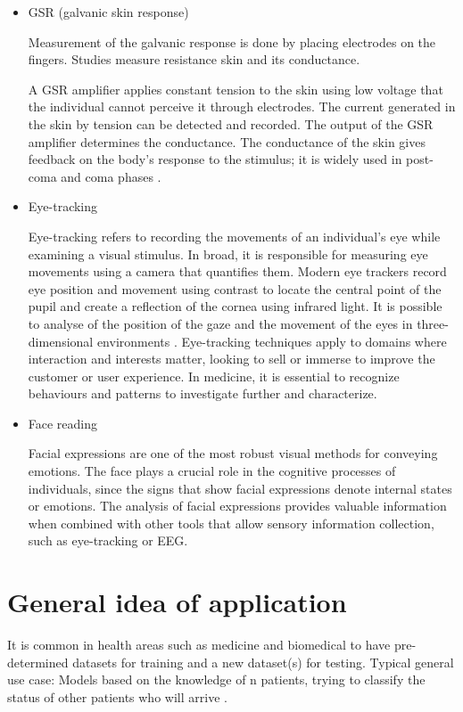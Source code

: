 \begin{itemize}
 
\item  GSR (galvanic skin response)

Measurement of the galvanic response is done by placing
electrodes on the fingers. Studies measure resistance
skin and its conductance.

A GSR amplifier applies constant tension to the skin using low voltage that the individual cannot
perceive it through electrodes. The current generated in the
skin by tension can be detected and recorded. The output of the GSR amplifier determines the conductance.
The conductance of the skin gives feedback on the body's response to the stimulus; it is widely used in post-coma and coma phases
\cite{Altntop2021,Luaute2018}.



\item  Eye-tracking

 Eye-tracking refers to recording the movements of an individual's eye while examining a visual stimulus. In broad, it is responsible for measuring eye movements using a camera that quantifies them. Modern eye trackers record eye position and movement using contrast to locate the central point of the pupil and create a reflection of the cornea using infrared light. It is possible to analyse of the position of the gaze and the movement of the eyes in three-dimensional environments \citep{Taherkhani2012}.
Eye-tracking techniques apply to domains where interaction and interests matter,
looking to sell or immerse to improve the customer or user experience. In medicine, it is essential to recognize behaviours and patterns to investigate further and characterize\cite{Ting2014}.


\item  Face reading

 Facial expressions are one of the most robust  visual methods for conveying emotions. The face plays a crucial role in the cognitive processes of individuals, since the signs that show facial expressions denote internal states or emotions. The analysis of facial expressions provides valuable information when combined with other tools that allow sensory information collection, such as eye-tracking or EEG.

\end{itemize}

\section{General idea of application}
It is common in health areas such as medicine and biomedical to have pre-determined datasets for training and a new dataset(s) for testing.
Typical general use case: Models based on the knowledge of n patients, trying to classify the status of other patients who will arrive \citep{MULLER2019145}.

